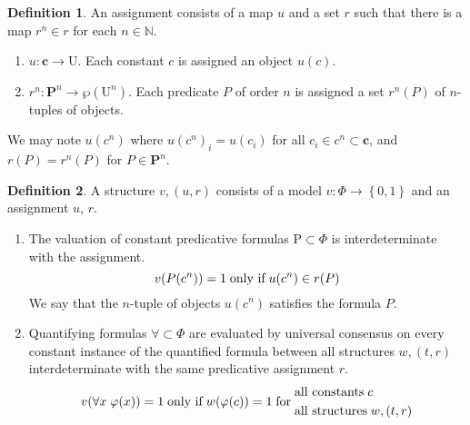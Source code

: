 \documentclass{amsbook}
\newcommand{\setsm}[1]{\left\{#1\right\}}
\newcommand{\univ}[1]{\mathord\forall#1\;}
\theoremstyle{definition}
\newtheorem{dfn}{Definition}[section]
\begin{document}
\begin{dfn}
    An assignment consists of a map $u$ and a set $r$ such that there is a map $r^n \in r$ for each $n \in \mathbb N$.
    \begin{enumerate}
        \item $u: \mathbf c \longrightarrow \mathrm U$.
              Each constant $c$ is assigned an object $u(c)$.
        \item $r^n: \mathbf P^n \longrightarrow \wp(\mathrm U^n)$.
              Each predicate $P$ of order $n$ is assigned a set $r^n(P)$ of $n$-tuples of objects.
    \end{enumerate}
    We may note $u(c^n)$ where $u(c^n)_i = u(c_i)$ for all $c_i \in c^n \subset \mathbf c$, and $r(P) = r^n(P)$ for $P \in \mathbf P^n$.
\end{dfn}

\begin{dfn}
    A structure $v, (u, r)$ consists of a model $v: \Phi \longrightarrow \setsm{0,1}$ and an assignment $u$, $r$.
    \begin{enumerate}
        \item
              The valuation of constant predicative formulas $\mathrm P \subset \Phi$ is interdeterminate with the assignment.
              $$v(P(c^n)) = 1 \text{\;only if\;} u(c^n) \in r(P)$$
              We say that the $n$-tuple of objects $u(c^n)$ satisfies the formula $P$.
        \item
              Quantifying formulas $\mathord\forall \subset \Phi$ are evaluated by universal consensus on every constant instance of the quantified formula between all structures $w, (t, r)$ interdeterminate with the same predicative assignment $r$.
              $$v(\univ x \varphi(x)) = 1 \text{\;only if\;} w(\varphi(c)) = 1 \text{\;for\;} \begin{aligned}
                       & \text{all constants\;} c \\
                       &
                      \text{all structures\;}
                      w, (t, r)
                  \end{aligned}$$
    \end{enumerate}
\end{dfn}
\end{document}
